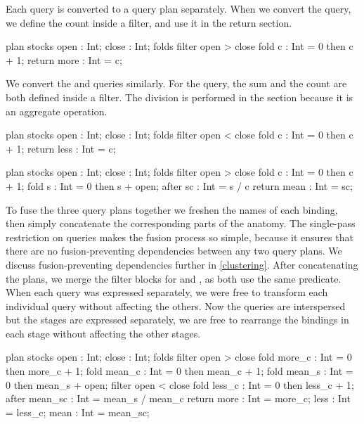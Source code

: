 Each query is converted to a query plan separately.
When we convert the \IcC@more@ query, we define the count inside a filter, and use it in the return section.

\begin{icicle-core}
plan stocks { open : Int; close : Int; }
folds { filter open > close {
    fold c    : Int = 0 then c + 1; } }
return { more : Int = c; }
\end{icicle-core}

We convert the \IcC@less@ and \IcC@mean@ queries similarly.
For the \IcC@mean@ query, the sum and the count are both defined inside a filter.
The division is performed in the \IcC@after@ section because it is an aggregate operation.

\begin{icicle-core}
plan stocks { open : Int; close : Int; }
folds { filter open < close {
    fold c    : Int = 0 then c + 1; } }
return { less : Int = c; }

plan stocks { open : Int; close : Int; }
folds { filter open > close {
    fold c    : Int = 0 then c + 1;
    fold s    : Int = 0 then s + open; } }
after  { sc   : Int = s / c }
return { mean : Int = sc; }
\end{icicle-core}

To fuse the three query plans together we freshen the names of each binding, then simply concatenate the corresponding parts of the anatomy.
The single-pass restriction on queries makes the fusion process so simple, because it ensures that there are no fusion-preventing dependencies between any two query plans. 
We discuss fusion-preventing dependencies further in \cref{clustering}.
After concatenating the plans, we merge the filter blocks for \IcC@more@ and \IcC@mean@, as both use the same predicate.
When each query was expressed separately, we were free to transform each individual query without affecting the others.
Now the queries are interspersed but the stages are expressed separately, we are free to rearrange the bindings in each stage without affecting the other stages.

\begin{icicle-core}
plan stocks { open : Int; close : Int; }
folds {
  filter open > close {
    fold more_c  : Int = 0 then more_c + 1;
    fold mean_c  : Int = 0 then mean_c + 1;
    fold mean_s  : Int = 0 then mean_s + open; }
  filter open < close {
    fold less_c  : Int = 0 then less_c + 1; } }
after  { mean_sc : Int = mean_s / mean_c }
return { more    : Int = more_c;
         less    : Int = less_c;
         mean    : Int = mean_sc; }
\end{icicle-core}

